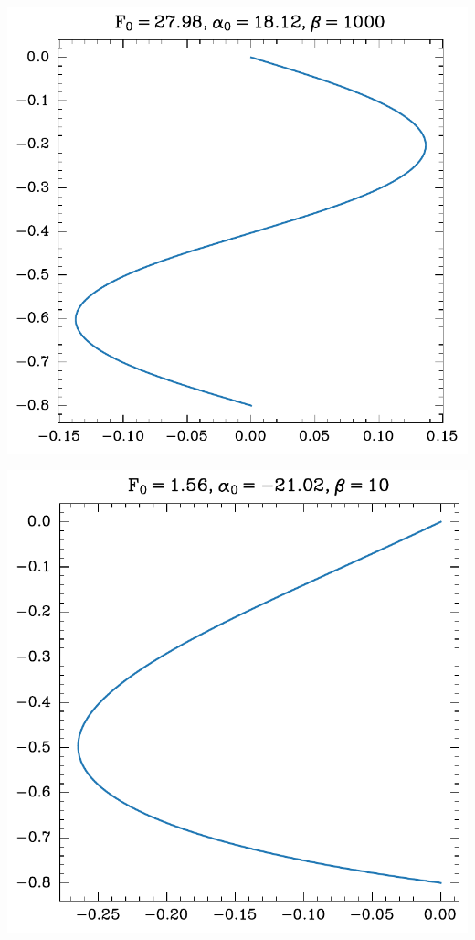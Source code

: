 \begin{center}
    \begin{minipage}{0.5\textwidth}
        \centering
    \includegraphics[width=\textwidth]{../images/2024-1-trajektorija0.pdf}
    \end{minipage}\hfill
    \begin{minipage}{0.5\textwidth}
        \centering
        \includegraphics[width=1\textwidth]{../images/2024-1-trajektorija7.pdf}
    \end{minipage}
\end{center}
